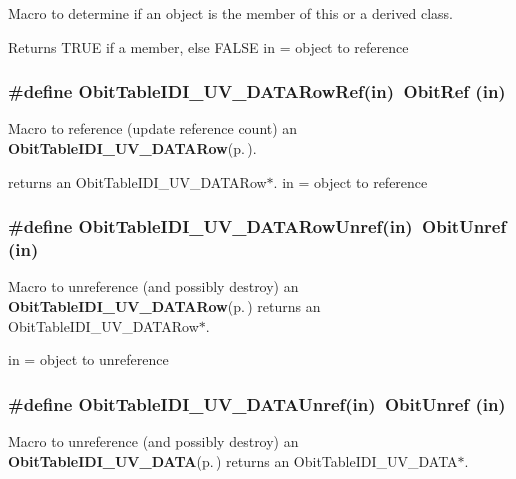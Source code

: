 Macro to determine if an object is the member of this or a derived class. 

Returns TRUE if a member, else FALSE in = object to reference 
\subsubsection{\setlength{\rightskip}{0pt plus 5cm}\#define Obit\-Table\-IDI\_\-UV\_\-DATARow\-Ref(in)\ Obit\-Ref (in)}\label{ObitTableIDI__UV__DATA_8h_a5}


Macro to reference (update reference count) an {\bf Obit\-Table\-IDI\_\-UV\_\-DATARow}{\rm (p.\,\pageref{structObitTableIDI__UV__DATARow})}. 

returns an Obit\-Table\-IDI\_\-UV\_\-DATARow$\ast$. in = object to reference 
\subsubsection{\setlength{\rightskip}{0pt plus 5cm}\#define Obit\-Table\-IDI\_\-UV\_\-DATARow\-Unref(in)\ Obit\-Unref (in)}\label{ObitTableIDI__UV__DATA_8h_a4}


Macro to unreference (and possibly destroy) an {\bf Obit\-Table\-IDI\_\-UV\_\-DATARow}{\rm (p.\,\pageref{structObitTableIDI__UV__DATARow})} returns an Obit\-Table\-IDI\_\-UV\_\-DATARow$\ast$. 

in = object to unreference 
\subsubsection{\setlength{\rightskip}{0pt plus 5cm}\#define Obit\-Table\-IDI\_\-UV\_\-DATAUnref(in)\ Obit\-Unref (in)}\label{ObitTableIDI__UV__DATA_8h_a1}


Macro to unreference (and possibly destroy) an {\bf Obit\-Table\-IDI\_\-UV\_\-DATA}{\rm (p.\,\pageref{structObitTableIDI__UV__DATA})} returns an Obit\-Table\-IDI\_\-UV\_\-DATA$\ast$. 


